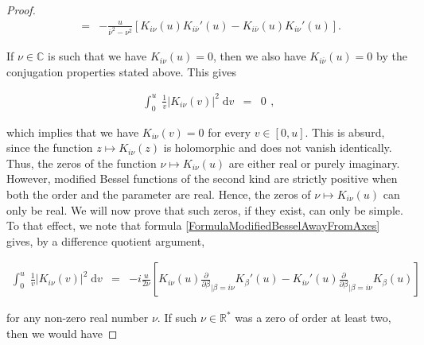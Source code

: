 \documentclass{jams-l}
\theoremstyle{definition}
\theoremstyle{remark}
\numberwithin{equation}{section}
\begin{document}
\begin{proof}
\begin{equation}
\begin{array}{lll}
                    & = & - \frac{u}{\overline{\nu}^2 - \nu^2} \left[ K_{i \nu} \left( u \right) K_{i \overline{\nu}}' \left( u \right) -  K_{i \overline{\nu}} \left( u \right) K_{i \nu}' \left( u \right) \right].
                \end{array}
            \end{equation}
            
            \noindent If $\nu \in\mathbb{C}$ is such that we have $K_{i \nu} \left( u \right) = 0$, then we also have $K_{i \overline{\nu}} \left( u \right) = 0$ by the conjugation properties stated above. This gives
            
            \[ \begin{array}{lll}
                    \int_0^u \; \frac{1}{v} \left \vert K_{i \nu} \left( v \right) \right \vert^2 \; \mathrm{d}v & = & 0
                \end{array} , \]
            
            \noindent which implies that we have $K_{i \nu} \left( v \right) = 0$ for every $v \in \left[ 0, u \right]$. This is absurd, since the function $z \longmapsto K_{i \nu} \left( z \right)$ is holomorphic and does not vanish identically. Thus, the zeros of the function $\nu \longmapsto K_{i \nu} \left( u \right)$ are either real or purely imaginary. However, modified Bessel functions of the second kind are strictly positive when both the order and the parameter are real. Hence, the zeros of $\nu \longmapsto K_{i \nu} \left( u \right)$ can only be real. We will now prove that such zeros, if they exist, can only be simple. To that effect, we note that formula \ref{FormulaModifiedBesselAwayFromAxes} gives, by a difference quotient argument,
            
            \begin{equation}
            \label{FormulaModifiedBesselRealOrder}
                \begin{array}{lll}
                    \int_0^u \; \frac{1}{v} \left \vert K_{i \nu} \left( v \right) \right \vert^2 \; \mathrm{d}v & = & - i \frac{u}{2 \nu} \left[ K_{i \nu} \left( u \right) \frac{\partial}{\partial \beta}_{\vert \beta = i \nu} K_{\beta}' \left( u \right) - K_{i \nu}' \left( u \right) \frac{\partial}{\partial \beta}_{\vert \beta = i \nu} K_{\beta} \left( u \right) \right]
                \end{array}
            \end{equation}
            
            \noindent for any non-zero real number $\nu$. If such $\nu \in \mathbb{R}^{\ast}$ was a zero of order at least two, then we would have
            

\end{proof}
\end{document}
